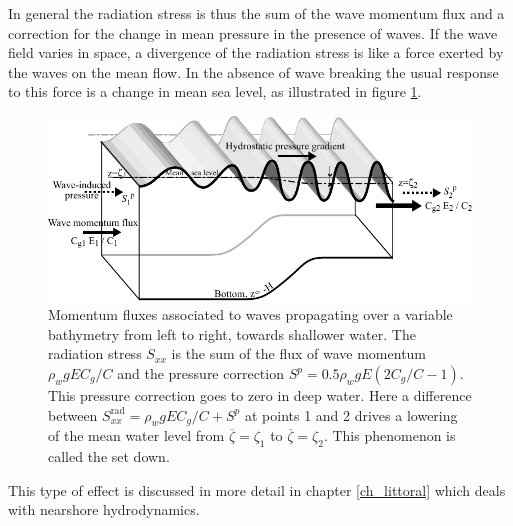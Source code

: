 In general the radiation stress is thus the sum of the wave momentum flux and a correction for the change 
in mean pressure in the presence of waves. If the wave field varies in space, a divergence of the radiation stress
is like a force exerted by the waves on the mean flow. In the absence of wave breaking the usual response to this 
force is a change in mean sea level, as illustrated in figure \ref{fig:mom_flux}.
\begin{figure}
\centerline{\includegraphics[width=\textwidth]{FIGS_CH_MOMENTUM/mom_flux.pdf}}
  \caption{Momentum fluxes associated to waves propagating over a variable bathymetry from left to right, towards shallower water. 
The radiation stress $S_{xx}$ 
is the sum of the flux of wave momentum $\rho_w g E C_g/C$ and the pressure correction $S^p=0.5 \rho_w g E (2 C_g/C -1)$. This 
pressure correction goes to zero in deep water. Here a difference between $S^{\mathrm{rad}}_{xx} = \rho_w g E C_g/C + S^p$ at 
points 1 and 2 drives a lowering of the mean water level from $\overline{\zeta}=\zeta_1$ to  $\overline{\zeta}=\zeta_2$. 
This phenomenon is called the set down.} 
\label{fig:mom_flux}
\end{figure}
This type of effect is discussed in more detail in chapter \ref{ch_littoral} which deals with nearshore 
hydrodynamics. 





